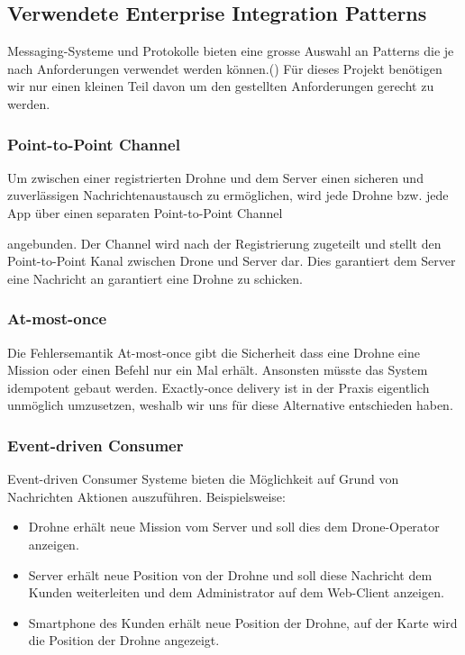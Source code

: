 {\subsection{Verwendete Enterprise Integration Patterns}
Messaging-Systeme und Protokolle bieten eine grosse Auswahl an Patterns die je nach Anforderungen verwendet werden können.({\cite{EIP}}) Für dieses Projekt benötigen wir nur einen kleinen Teil davon um den gestellten Anforderungen gerecht zu werden.
%
\subsubsection{Point-to-Point Channel}
Um zwischen einer registrierten Drohne und dem Server einen sicheren und zuverlässigen Nachrichtenaustausch zu ermöglichen, wird jede Drohne bzw. jede App über einen separaten Point-to-Point Channel	\cite[S. 103]{EIP}} angebunden. Der Channel wird nach der Registrierung zugeteilt und stellt den Point-to-Point Kanal zwischen Drone und Server dar. Dies garantiert dem Server eine Nachricht an garantiert eine Drohne zu schicken.
%
\subsubsection{At-most-once}

Die Fehlersemantik At-most-once gibt die Sicherheit dass eine Drohne eine Mission oder einen Befehl nur ein Mal erhält. Ansonsten müsste das System idempotent gebaut werden. Exactly-once delivery ist in der Praxis eigentlich unmöglich umzusetzen, weshalb wir uns für diese Alternative entschieden haben. 
%
\subsubsection{Event-driven Consumer}
{Event-driven Consumer \cite[S. 442]{EIP}} Systeme bieten die Möglichkeit auf Grund von Nachrichten Aktionen auszuführen. Beispielsweise:
%
\begin{itemize}
	\item Drohne erhält neue Mission vom Server und soll dies dem Drone-Operator anzeigen.
	\item Server erhält neue Position von der Drohne und soll diese Nachricht dem Kunden weiterleiten und dem Administrator auf dem Web-Client anzeigen.
	\item Smartphone des Kunden erhält neue Position der Drohne, auf der Karte wird die Position der Drohne angezeigt.
\end{itemize}


